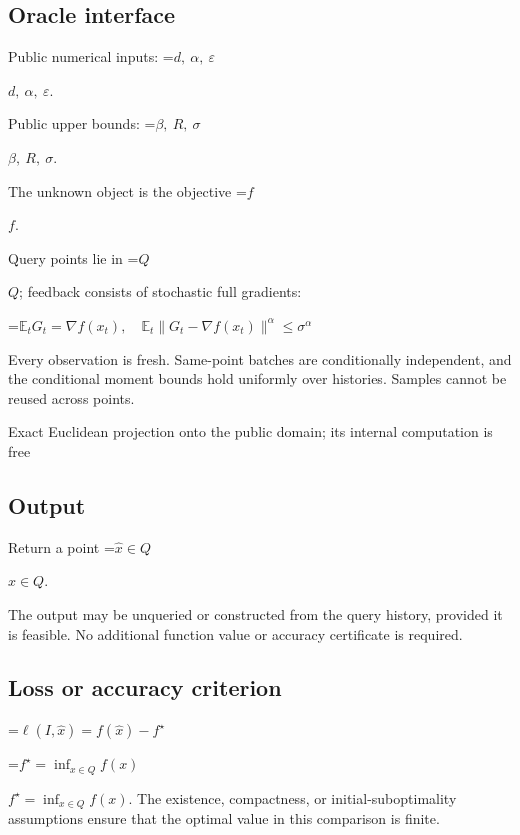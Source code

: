 \documentclass[10pt,a4paper]{article}
\newcommand{\AtlasMath}[1]{\par\begingroup\centering\setbox0=\hbox{$\displaystyle #1$}\ifdim\wd0>1.4\linewidth\typeout{ATLAS WIDE FORMULA: \the\wd0}\fi\ifdim\wd0>\linewidth\resizebox{\linewidth}{!}{\box0}\else\box0\fi\par\endgroup}
\newcommand{\AtlasInlineMath}[1]{\begingroup\setbox0=\hbox{$#1$}\ifdim\wd0>.4\linewidth\endgroup\AtlasMath{#1}\else\endgroup$#1$\fi}
\begin{document}
\subsection{Oracle interface}


Public numerical inputs: \AtlasInlineMath{d,\ \alpha,\ \varepsilon}.



Public upper bounds: \AtlasInlineMath{\beta,\ R,\ \sigma}.



The unknown object is the objective \AtlasInlineMath{f}.



Query points lie in \AtlasInlineMath{Q}; feedback consists of stochastic full gradients:




\AtlasMath{\mathbb{E}_tG_t=\nabla f(x_t),\quad\mathbb{E}_t\|G_t-\nabla f(x_t)\|^\alpha\le\sigma^\alpha}




Every observation is fresh. Same-point batches are conditionally independent, and the conditional moment bounds hold uniformly over histories. Samples cannot be reused across points.



Exact Euclidean projection onto the public domain; its internal computation is free



\subsection{Output}


Return a point \AtlasInlineMath{\widehat x\in Q}.



The output may be unqueried or constructed from the query history, provided it is feasible. No additional function value or accuracy certificate is required.



\subsection{Loss or accuracy criterion}



\AtlasMath{\ell(I,\widehat{x})=f(\widehat{x})-f^\star}




\AtlasInlineMath{f^\star=\inf_{x\in Q}f(x)}. The existence, compactness, or initial-suboptimality assumptions ensure that the optimal value in this comparison is finite.
\end{document}
